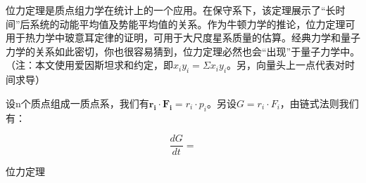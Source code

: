 位力定理是质点组力学在统计上的一个应用。在保守系下，该定理展示了“长时间”后系统的动能平均值及势能平均值的关系。作为牛顿力学的推论，位力定理可用于热力学中玻意耳定律的证明，可用于大尺度星系质量的估算。经典力学和量子力学的关系如此密切，你也很容易猜到，位力定理必然也会“出现”于量子力学中。（注：本文使用爱因斯坦求和约定，即$x_iy_i=\Sigma x_iy_i$。另，向量头上一点代表对时间求导）

设n个质点组成一质点系，我们有$\boldsymbol{r_i\cdot F_i}=r_i\cdot p_i$。另设$G=r_i\cdot F_i$，由链式法则我们有：

\begin{equation}
\frac{dG}{dt}=
\end{equation}

\begin{theorem}{位力定理}

\end{theorem}
